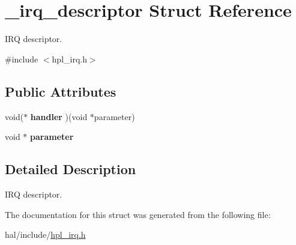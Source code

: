 \hypertarget{struct__irq__descriptor}{}\section{\+\_\+irq\+\_\+descriptor Struct Reference}
\label{struct__irq__descriptor}


I\+RQ descriptor.  




{\ttfamily \#include $<$hpl\+\_\+irq.\+h$>$}

\subsection*{Public Attributes}
\begin{DoxyCompactItemize}
\item 
\mbox{\label{struct__irq__descriptor_a5c5645efb32460ff3105eff8e6206b91}} 
void($\ast$ {\bfseries handler} )(void $\ast$parameter)
\item 
\mbox{\label{struct__irq__descriptor_a9c58c3f373aebb6b725b9b47def981fd}} 
void $\ast$ {\bfseries parameter}
\end{DoxyCompactItemize}


\subsection{Detailed Description}
I\+RQ descriptor. 

The documentation for this struct was generated from the following file\+:\begin{DoxyCompactItemize}
\item 
hal/include/\hyperlink{hpl__irq_8h}{hpl\+\_\+irq.\+h}\end{DoxyCompactItemize}
